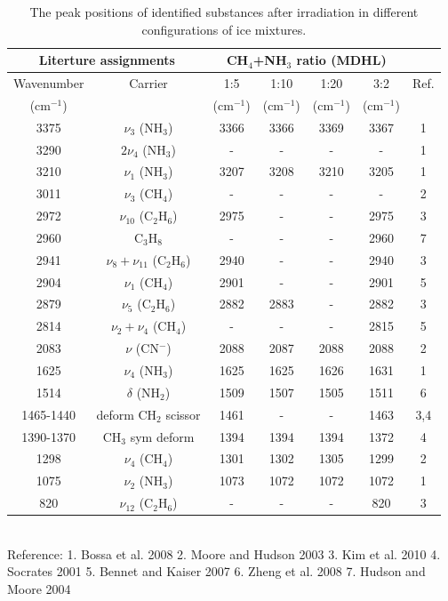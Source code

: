 \begin{table}[htbp]
\caption{The peak positions of identified substances after irradiation in different configurations of ice mixtures.}
\label{tab:WavenumberMDHL}
\begin{tabular}{ccccccc}
\hline
\hline
\multicolumn{2}{c}{Literture assignments} & \multicolumn{4}{c}{CH$_4$+NH$_3$ ratio (MDHL)} &  \\
\hline
Wavenumber & Carrier  & 1:5  & 1:10  & 1:20  & 3:2  & Ref. \\
(cm$^{-1}$) &   & (cm$^{-1}$) & (cm$^{-1}$) & (cm$^{-1}$) & (cm$^{-1}$) &\\
\hline
3375 & $\nu_3$ (NH$_3$) & 3366 & 3366 & 3369 & 3367 & 1 \\
3290 & $2\nu_4$ (NH$_3$) & - & - & - & - & 1 \\
3210 & $\nu_1$ (NH$_3$) & 3207 & 3208 & 3210 & 3205 & 1 \\
3011 & $\nu_3$ (CH$_4$) & - & - & - & - & 2 \\
2972 & $\nu_{10}$ (C$_2$H$_6$) & 2975 & - & - & 2975 & 3 \\
2960 & C$_3$H$_8$ & - & - & - & 2960 & 7 \\
2941 & $\nu_8+\nu_11$ (C$_2$H$_6$) & 2940 & - & - & 2940 & 3 \\
2904 & $\nu_1$ (CH$_4$) & 2901 & - & - & 2901 & 5 \\
2879 & $\nu_5$ (C$_2$H$_6$) & 2882 & 2883 & - & 2882 & 3 \\
2814 & $\nu_2+\nu_4$ (CH$_4$) & - & - & - & 2815 & 5 \\
2083 & $\nu$ (CN$^-$) & 2088 & 2087 & 2088 & 2088 & 2 \\
1625 & $\nu_4$ (NH$_3$) & 1625 & 1625 & 1626 & 1631 & 1 \\
1514 & $\delta$ (NH$_2$) & 1509 & 1507 & 1505 & 1511 & 6 \\
1465-1440 & deform CH$_2$ scissor & 1461 & - & - & 1463 & 3,4 \\
1390-1370 & CH$_3$ sym deform & 1394 & 1394 & 1394 & 1372 & 4 \\
1298 & $\nu_4$ (CH$_4$) & 1301 & 1302 & 1305 & 1299 & 2 \\
1075 & $\nu_2$ (NH$_3$) & 1073 & 1072 & 1072 & 1072 & 1 \\
820 & $\nu_12$ (C$_2$H$_6$) & - & - & - & 820 & 3 \\
\hline
\end{tabular}\\
Reference: 1. Bossa et al. 2008 \cite{bossa2008carbamic} 2. Moore and Hudson 2003 \cite{moore2003infrared} 3. Kim et al. 2010 \cite{kim2010abiotic} 4. Socrates 2001 \cite{socrates2001infrared} 5. Bennet and Kaiser 2007 \cite{bennett2007formation} 6. Zheng et al. 2008 \cite{zheng2008formation} 7. Hudson and Moore 2004 \cite{hudson2004reactions}
\end{table}


